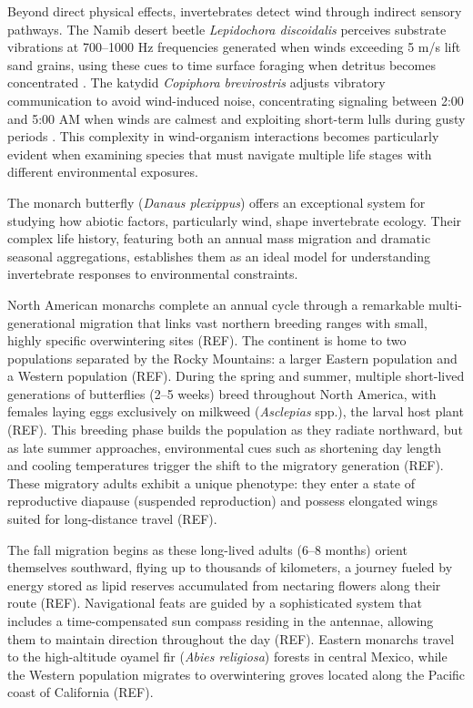 Beyond direct physical effects, invertebrates detect wind through indirect sensory pathways. The Namib desert beetle \textit{Lepidochora discoidalis} perceives substrate vibrations at 700--1000 Hz frequencies generated when winds exceeding 5 m/s lift sand grains, using these cues to time surface foraging when detritus becomes concentrated \citep{seelySandstormsTenebrionidBeetles1997}. The katydid \textit{Copiphora brevirostris} adjusts vibratory communication to avoid wind-induced noise, concentrating signaling between 2:00 and 5:00 AM when winds are calmest and exploiting short-term lulls during gusty periods \citep{rohmerGoneWindSignal2010}. This complexity in wind-organism interactions becomes particularly evident when examining species that must navigate multiple life stages with different environmental exposures.

The monarch butterfly (\textit{Danaus plexippus}) offers an exceptional system for studying how abiotic factors, particularly wind, shape invertebrate ecology. Their complex life history, featuring both an annual mass migration and dramatic seasonal aggregations, establishes them as an ideal model for understanding invertebrate responses to environmental constraints.

North American monarchs complete an annual cycle through a remarkable multi-generational migration that links vast northern breeding ranges with small, highly specific overwintering sites (REF). The continent is home to two populations separated by the Rocky Mountains: a larger Eastern population and a Western population (REF). During the spring and summer, multiple short-lived generations of butterflies (2--5 weeks) breed throughout North America, with females laying eggs exclusively on milkweed (\textit{Asclepias} spp.), the larval host plant (REF). This breeding phase builds the population as they radiate northward, but as late summer approaches, environmental cues such as shortening day length and cooling temperatures trigger the shift to the migratory generation (REF). These migratory adults exhibit a unique phenotype: they enter a state of reproductive diapause (suspended reproduction) and possess elongated wings suited for long-distance travel (REF).

The fall migration begins as these long-lived adults (6--8 months) orient themselves southward, flying up to thousands of kilometers, a journey fueled by energy stored as lipid reserves accumulated from nectaring flowers along their route (REF). Navigational feats are guided by a sophisticated system that includes a time-compensated sun compass residing in the antennae, allowing them to maintain direction throughout the day (REF). Eastern monarchs travel to the high-altitude oyamel fir (\textit{Abies religiosa}) forests in central Mexico, while the Western population migrates to overwintering groves located along the Pacific coast of California (REF).

